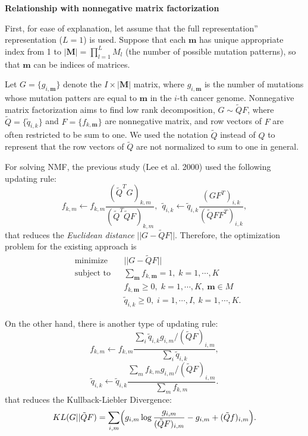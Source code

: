 \documentclass{article}
\begin{document}

\vspace*{1.0cm}
{\LARGE \bf Relationship with nonnegative matrix factorization}
\vspace*{0.25cm}


First, for ease of explanation, let assume that the full representation'' representation ($L = 1$) is used.
Suppose that each $\bm{m}$ has unique appropriate index from 1 to  $| \bm{M} | = \prod_{l=1}^L M_l$ (the number of possible mutation patterns),
so that $\bm{m}$ can be indices of matrices.

Let $G = \{ g_{i, \bm{m}} \}$ denote the $I \times | \bm{M} | $ matrix, 
where $g_{i, \bm{m}}$ is the number of mutations whose mutation patters are equal to $\bm{m}$ in the $i$-th cancer genome.
Nonnegative matrix factorization aims to find low rank decomposition, 
$G \sim \tilde{Q} F$,
where $\tilde{Q} = \{ \tilde{q}_{i,k} \}$ and $F = \{ f_{k, \bm{m}} \}$ are nonnegative matrix, 
and row vectors of $F$ are often restricted to be sum to one. 
We used the notation $\tilde{Q}$ instead of $Q$
to represent that the row vectors of $\tilde{Q}$ are not normalized to sum to one in general.

For solving NMF, 
the previous study (Lee et al. 2000) used the following updating rule:
\begin{equation*}
f_{k,m} \gets f_{k,m} \frac{ ( \tilde{Q}^T G)_{k,m} }{ ( \tilde{Q}^T \tilde{Q} F  )_{k,m} },\  \
\tilde{q}_{i,k} \gets \tilde{q}_{i,k}  \frac{ (G F^T)_{i,k} }{ ( \tilde{Q} F F^T )_{i,k} },
\end{equation*}
that reduces the {\it Euclidean distance} $|| G - \tilde{Q} F ||$. 
Therefore, the optimization problem for the existing approach is
\begin{equation}
\begin{aligned}
& \text{minimize}
& & ||G - \tilde{Q} F || \\
& \text{subject to}
& & \sum_{ \bm{m} } f_{k, \bm{m}} =  1, \; k = 1, \cdots, K \\ &
& & f_{k, \bm{m}} \geq 0, \; k = 1, \cdots, K,\ \bm{m} \in M \\ & 
& & \tilde{q}_{i, k} \geq 0, \; i = 1, \cdots, I,\ k = 1, \cdots, K.
\end{aligned}
\end{equation}

On the other hand, there is another type of updating rule:
\begin{equation*}
f_{k,m} \gets f_{k,m} \frac{ \sum_i \tilde{q}_{i,k} g_{i,m} / ( \tilde{Q} F)_{i,m} }{ \sum_i \tilde{q}_{i,k} },
\end{equation*}
\begin{equation*}
\tilde{q}_{i,k} \gets \tilde{q}_{i,k}  \frac{ \sum_m f_{k,m} g_{i,m} / ( \tilde{Q} F)_{i,m} }{ \sum_m f_{k,m} }.
\end{equation*}
that reduces the Kullback-Liebler Divergence:
\begin{equation*}
KL(G ||  \tilde{Q} F) = \sum_{i,m} \Bigl( g_{i,m} \log  \frac{ g_{i,m} }{ (\tilde{Q} F)_{i,m} } - g_{i,m} + ( \tilde{Q} f )_{i,m} \Bigr).
\end{equation*}
\end{document}

